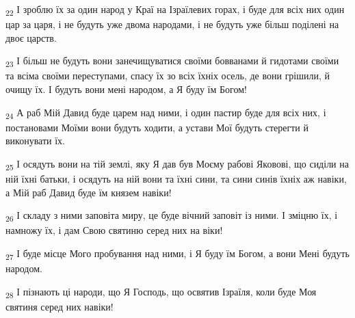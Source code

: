 \begin{tcolorbox}
\textsubscript{22} І зроблю їх за один народ у Краї на Ізраїлевих горах, і буде для всіх них один цар за царя, і не будуть уже двома народами, і не будуть уже більш поділені на двоє царств.
\end{tcolorbox}
\begin{tcolorbox}
\textsubscript{23} І більш не будуть вони занечищуватися своїми бовванами й гидотами своїми та всіма своїми переступами, спасу їх зо всіх їхніх осель, де вони грішили, й очищу їх. І будуть вони мені народом, а Я буду їм Богом!
\end{tcolorbox}
\begin{tcolorbox}
\textsubscript{24} А раб Мій Давид буде царем над ними, і один пастир буде для всіх них, і постановами Моїми вони будуть ходити, а устави Мої будуть стерегти й виконувати їх.
\end{tcolorbox}
\begin{tcolorbox}
\textsubscript{25} І осядуть вони на тій землі, яку Я дав був Моєму рабові Яковові, що сиділи на ній їхні батьки, і осядуть на ній вони та їхні сини, та сини синів їхніх аж навіки, а Мій раб Давид буде їм князем навіки!
\end{tcolorbox}
\begin{tcolorbox}
\textsubscript{26} І складу з ними заповіта миру, це буде вічний заповіт із ними. І зміцню їх, і намножу їх, і дам Свою святиню серед них на віки!
\end{tcolorbox}
\begin{tcolorbox}
\textsubscript{27} І буде місце Мого пробування над ними, і Я буду їм Богом, а вони Мені будуть народом.
\end{tcolorbox}
\begin{tcolorbox}
\textsubscript{28} І пізнають ці народи, що Я Господь, що освятив Ізраїля, коли буде Моя святиня серед них навіки!
\end{tcolorbox}
